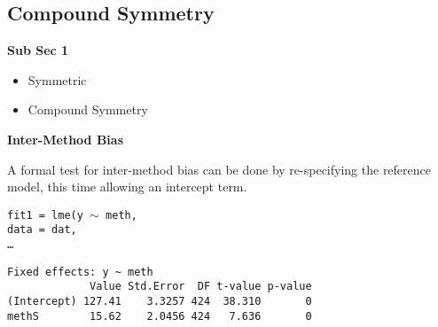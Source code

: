 \documentclass[compress]{beamer}        %
\makeatletter
\newcommand{\tcb}{\textcolor{beamer@blendedblue}}
\makeatother
\begin{document}
\subsection{Compound Symmetry}
\begin{frame}{\bf \tcb{Sub Sec 1}}
\begin{itemize}\itemsep0.7cm
\item Symmetric
\item Compound Symmetry
\end{itemize}
\end{frame}

\begin{frame}[fragile]{\bf \tcb{Inter-Method Bias}}

A formal test for inter-method bias can be done by re-specifying the reference model, this time allowing an intercept term.

\texttt{fit1 = lme(y $\sim$ meth,\\
   \hspace{0.6cm} data = dat,\\
   \hspace{0.6cm} \ldots}

\begin{verbatim}
Fixed effects: y ~ meth
             Value Std.Error  DF t-value p-value
(Intercept) 127.41    3.3257 424  38.310       0
methS        15.62    2.0456 424   7.636       0

\end{verbatim}
\end{frame}


\end{document}
